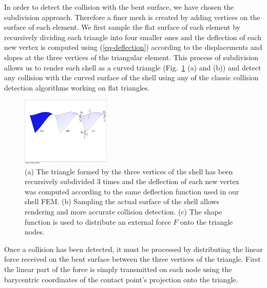 \documentclass{llncs}
\begin{document}
In order to detect the collision with the bent surface, we have chosen the subdivision approach. Therefore a finer mesh is created by adding vertices on the surface of each element. We first sample the flat surface of each element by recursively dividing each triangle into four smaller ones and the deflection of each new vertex is computed using (\ref{eq-deflection}) according to the displacements and slopes at the three vertices of the triangular element. This process of subdivision allows us to render each shell as a curved triangle (Fig.~\ref{fig-shell} (a) and (b)) and detect any collision with the curved surface of the shell using any of the classic collision detection algorithms working on flat triangles.
\begin{figure}
\centering
\vspace{-0.5cm}
\includegraphics[height=3.3cm]{images/shell_curvature.pdf}
\vspace{-0.4cm}
\caption {(a)  The triangle formed by the three vertices of the shell has been recursively subdivided 3 times and the deflection of each new vertex was computed according to the same deflection function used in our shell FEM. (b) Sampling the actual surface of the shell allows rendering and more accurate collision detection. (c) The shape function is used to distribute an external force $F$ onto the triangle nodes.}
\label{fig-shell}
\vspace{-0.4cm}
\end{figure}

Once a collision has been detected, it must be processed by distributing the linear force received on the bent surface between the three vertices of the triangle. First the linear part of the force is simply transmitted on each node using the barycentric coordinates of the contact point's projection onto the triangle. 
\end{document}

